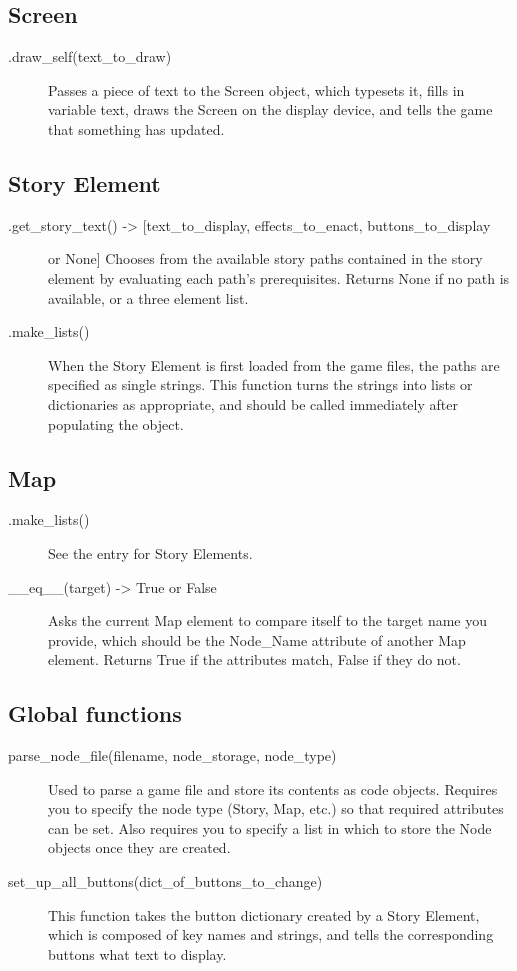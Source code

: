 \documentclass[11pt]{article}
\begin{document}
\subsection{Screen}
\begin{description}
	\item[.draw_self(text_to_draw)] Passes a piece of text to the Screen object, which typesets it, fills in variable text, draws the Screen on the display device, and tells the game that something has updated.
\end{description}


\subsection{Story Element}
\begin{description}
	\item[.get_story_text() -> [text_to_display, effects_to_enact, buttons_to_display] or None] Chooses from the available story paths contained in the story element by evaluating each path's prerequisites. Returns None if no path is available, or a three element list.
	\item[.make_lists()] When the Story Element is first loaded from the game files, the paths are specified as single strings. This function turns the strings into lists or dictionaries as appropriate, and should be called immediately after populating the object.
\end{description}

\subsection{Map}
\begin{description}
	\item[.make_lists()] See the entry for Story Elements.
	\item[__eq__(target) -> True or False] Asks the current Map element to compare itself to the target name you provide, which should be the Node_Name attribute of another Map element. Returns True if the attributes match, False if they do not.
\end{description}

\subsection{Global functions}
\begin{description}
	\item[parse_node_file(filename, node_storage, node_type)] Used to parse a game file and store its contents as code objects. Requires you to specify the node type (Story, Map, etc.) so that required attributes can be set. Also requires you to specify a list in which to store the Node objects once they are created.
	\item[set_up_all_buttons(dict_of_buttons_to_change)] This function takes the button dictionary created by a Story Element, which is composed of key names and strings, and tells the corresponding buttons what text to display.
\end{description}
\end{document}

